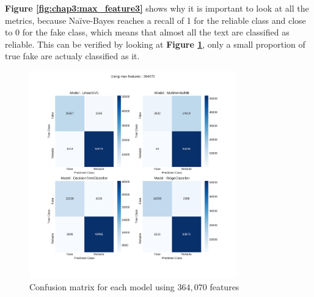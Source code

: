 \textbf{Figure \ref{fig:chap3:max_feature3}} shows why it is important to look at all the metrics, because Naïve-Bayes reaches a recall of 1 for the reliable class and close to 0 for the fake class, which means that almost all the text are classified as reliable. This can be verified by looking at \textbf{Figure \ref{fig:chap3:confMat1}}, only a small proportion of true fake are actualy classified as it.

\begin{figure}
	\centering
	\includegraphics[width=0.8\textwidth]{images/chapitre3/confMat_fake_364070}
	\caption{Confusion matrix for each model using $364,070$ features}
	\label{fig:chap3:confMat1}
\end{figure}